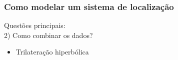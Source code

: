 \documentclass{beamer}
\begin{document}
\begin{frame}
\frametitle{\normalsize Como modelar um sistema de localização}
\begin{flushleft}
	Questões principais: \\
	\hspace{0.5cm} 2) Como combinar os dados?
	\begin{itemize}
		\item Trilateração hiperbólica
	\end{itemize}
	\vspace{-0.4cm}
	
	\begin{figure}
	\end{figure}
	\vspace{0.4cm}
\end{flushleft}
\end{frame}
\end{document}
